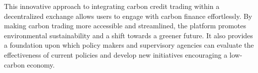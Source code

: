 \documentclass[sigconf, authordraft]{acmart}
\begin{document}
	This innovative approach to integrating carbon credit trading within a
	decentralized exchange allows users to engage with carbon finance effortlessly.
	By making carbon trading more accessible and streamlined, the platform
	promotes environmental sustainability and a shift towards a greener future. It
	also provides a foundation upon which policy makers and supervisory agencies can
	evaluate the effectiveness of current policies and develop new initiatives encouraging
	a low-carbon economy.

	
	


	\appendix
\end{document}
